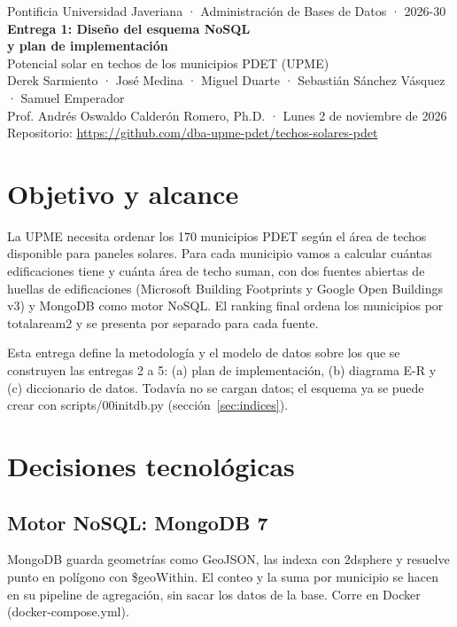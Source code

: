 \documentclass[11pt,a4paper]{article}
\newcommand{\brkus}{\textunderscore\allowbreak}
\newcommand{\f}[1]{{\ttfamily\let\_\brkus #1}}
\begin{document}
\begin{center}
  {\small Pontificia Universidad Javeriana · Administración de Bases de Datos · 2026-30}\\[0.9em]
  {\LARGE\bfseries\color{acento} Entrega 1: Diseño del esquema NoSQL\\[0.2em] y plan de implementación}\\[0.8em]
  {\large Potencial solar en techos de los municipios PDET (UPME)}\\[0.8em]
  Derek Sarmiento · José Medina · Miguel Duarte · Sebastián Sánchez Vásquez · Samuel Emperador\\[0.3em]
  {\small Prof. Andrés Oswaldo Calderón Romero, Ph.D. · Lunes 2 de noviembre de 2026}\\[0.3em]
  {\small Repositorio: \url{https://github.com/dba-upme-pdet/techos-solares-pdet}}
\end{center}

\section{Objetivo y alcance}

La UPME necesita ordenar los 170 municipios PDET según el área de techos disponible para paneles solares. Para cada municipio vamos a calcular cuántas edificaciones tiene y cuánta área de techo suman, con dos fuentes abiertas de huellas de edificaciones (Microsoft Building Footprints y Google Open Buildings v3) y MongoDB como motor NoSQL. El ranking final ordena los municipios por \f{total\_area\_m2} y se presenta por separado para cada fuente.

Esta entrega define la metodología y el modelo de datos sobre los que se construyen las entregas 2 a 5: (a) plan de implementación, (b) diagrama E-R y (c) diccionario de datos. Todavía no se cargan datos; el esquema ya se puede crear con \f{scripts/00\_init\_db.py} (sección~\ref{sec:indices}).

\section{Decisiones tecnológicas}

\subsection{Motor NoSQL: MongoDB 7}

MongoDB guarda geometrías como GeoJSON, las indexa con \f{2dsphere} y resuelve punto en polígono con \f{\$geoWithin}. El conteo y la suma por municipio se hacen en su pipeline de agregación, sin sacar los datos de la base. Corre en Docker (\f{docker-compose.yml}).
\end{document}
